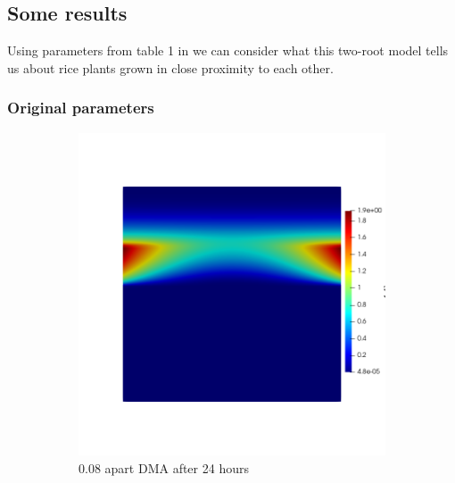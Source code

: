 \documentclass[11pt]{article}
\numberwithin{equation}{section}
\begin{document}
\subsection{Some results}
Using parameters from table 1 in \cite{Ptashnyk-2011} we can consider what this two-root model tells us about rice plants grown in close proximity to each other.
\subsubsection{Original parameters}
 \begin{figure}[h]
     \centering
     \caption{Basic model with parameters from \cite{Ptashnyk-2011} applied to both roots.}
     \begin{subfigure}[t]{0.45\textwidth}\centering
     \includegraphics[width=\textwidth]{Figures/testpics/BasicDMA.png}
     \caption{0.08 apart DMA after 24 hours}
     \end{subfigure}
     \begin{subfigure}[t]{0.45\textwidth}\centering

\end{subfigure}
\end{figure}
\end{document}
